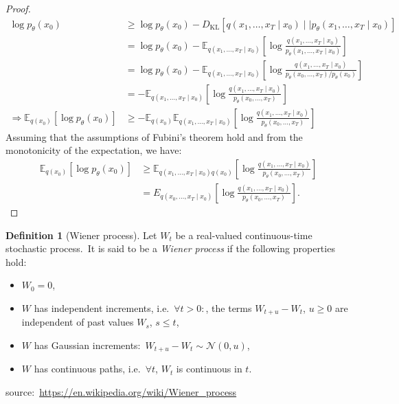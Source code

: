 \documentclass[12pt, a4paper]{article}
\numberwithin{equation}{section}
\theoremstyle{definition}
\theoremstyle{definition}
\newtheorem{defn}[thm]{Definition} %
\begin{document}
	\begin{proof}
	\cite{lilian_weng}
		\begin{align}
			\log p_{\theta}(x_{0}) &\geq \log p_{\theta}(x_{0}) - D_{\text{KL}}\left[ q(x_{1}, \dots, x_{T}\mid x_{0})\mid\mid p_{\theta}(x_{1}, \dots, x_{T}\mid x_{0}) \right]
			\\[4pt] &= \log p_{\theta}(x_{0}) - \mathbb E_{q(x_{1}, \dots, x_{T}\mid x_{0})}\left[\log\frac{q(x_{1}, \dots, x_{T}\mid x_{0})}{p_{\theta}(x_{1}, \dots, x_{T} \mid x_{0})}\right]
			\\[4pt] &= \log p_{\theta}(x_{0}) - \mathbb E_{q(x_{1}, \dots, x_{T}\mid x_{0})}\left[\log\frac{q(x_{1}, \dots, x_{T}\mid x_{0})}{p_{\theta}(x_{0}, \dots, x_{T})/ p_{\theta}(x_{0})}\right]
			\\[4pt] &= -\mathbb E_{q(x_{1}, \dots, x_{T}\mid x_{0})}\left[\log\frac{q(x_{1}, \dots, x_{T}\mid x_{0})}{p_{\theta}(x_{0}, \dots, x_{T})}\right]
			\\[4pt] \Rightarrow \mathbb E_{q(x_{0})}\left[\log p_{\theta}(x_{0})\right] &\geq -\mathbb E_{q(x_{0})}\mathbb E_{q(x_{1}, \dots, x_{T}\mid x_{0})}\left[\log\frac{q(x_{1}, \dots, x_{T}\mid x_{0})}{p_{\theta}(x_{0}, \dots, x_{T})}\right]
		\end{align}
		Assuming that the assumptions of Fubini's theorem hold and from the monotonicity of the expectation, we have: 
		\begin{align}\label{diff_elbo_to_be_proved}
			\mathbb E_{q(x_{0})}\left[ \log p_{\theta}(x_{0}) \right] &\geq \mathbb E_{q(x_{1}, \dots,  x_{T} \mid x_{0})q(x_{0})}\left[\log \frac{q(x_{1}, \dots, x_{T} \mid x_{0})}{p_{\theta}(x_{0}, \dots, x_{T})}\right] 
			\\ &= E_{q(x_{0}, \dots,  x_{T} \mid x_{0})}\left[\log \frac{q(x_{1}, \dots, x_{T} \mid x_{0})}{p_{\theta}(x_{0}, \dots, x_{T})}\right].
		\end{align}
	\end{proof}
	
	\begin{defn}[Wiener process]
		Let $W_{t}$ be a real-valued continuous-time stochastic process.\ It is said to be a \textit{Wiener process} if the following properties hold: 
		\begin{itemize}
			\item $W_{0} = 0$, 
			\item $W$ has independent increments, i.e.\ $\forall t > 0:$, the terms $W_{t+u} - W_{t}$, $u\geq 0$ are independent of past values $W_{s}$, $s\leq t$, 
			\item $W$ has Gaussian increments:\ $W_{t+u} - W_{t} \sim \mathcal N(0, u)$, 
			\item $W$ has continuous paths, i.e.\ $\forall t$, $W_{t}$ is continuous in $t$. 
		\end{itemize}
		source:\ \url{https://en.wikipedia.org/wiki/Wiener_process}
	\end{defn}
	
\end{document}
